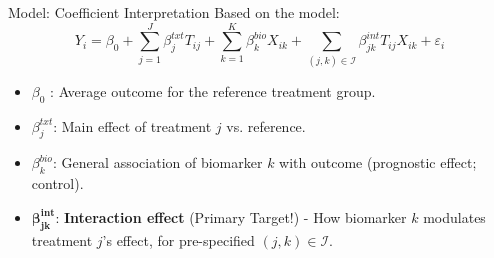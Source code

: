 \documentclass{beamer}
\begin{document}
\begin{frame}{Model: Coefficient Interpretation}
  Based on the model:
  $$ Y_i = \beta_0 + \sum_{j=1}^J \beta^{txt}_j T_{ij} + \sum_{k=1}^K \beta^{bio}_k X_{ik} + \sum_{(j,k) \in \mathcal{I}} \beta^{int}_{jk} T_{ij} X_{ik} + \varepsilon_i $$
  \vspace{1em}
  \begin{itemize}
      \item $\beta_0$ : Average outcome for the reference treatment group. \pause
      \item $\beta^{txt}_j$: Main effect of treatment $j$ vs. reference. \pause
      \item $\beta^{bio}_k$: General association of biomarker $k$ with outcome (prognostic effect; control). \pause
      \item $\mathbf{\beta^{int}_{jk}}$: \textbf{Interaction effect} (Primary Target!) - How biomarker $k$ modulates treatment $j$'s effect, for pre-specified $(j,k) \in \mathcal{I}$.
  \end{itemize}
\end{frame}
\end{document}
